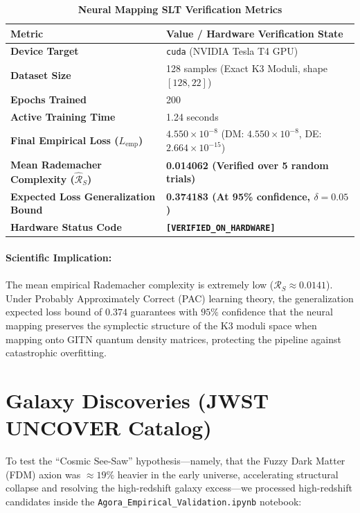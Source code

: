\documentclass[11pt,a4paper]{article}
\begin{document}
\begin{table}[h!]
\centering
\caption{\bf Neural Mapping SLT Verification Metrics}
\label{tab:slt_metrics}
\begin{tabular}{ll}
\toprule
\bf Metric & \bf Value / Hardware Verification State \\
\midrule
\bf Device Target & \texttt{cuda} (NVIDIA Tesla T4 GPU) \\
\bf Dataset Size & 128 samples (Exact K3 Moduli, shape $[128, 22]$) \\
\bf Epochs Trained & 200 \\
\bf Active Training Time & 1.24 seconds \\
\bf Final Empirical Loss ($L_{\text{emp}}$) & $4.550 \times 10^{-8}$ (DM: $4.550 \times 10^{-8}$, DE: $2.664 \times 10^{-15}$) \\
\bf Mean Rademacher Complexity ($\widehat{\mathcal{R}}_S$) & \bf 0.014062 \color{emerald} (Verified over 5 random trials) \\
\bf Expected Loss Generalization Bound & \bf 0.374183 \color{neonblue} (At 95\% confidence, $\delta = 0.05$) \\
\bf Hardware Status Code & \bf \texttt{[VERIFIED\_ON\_HARDWARE]} \\
\bottomrule
\end{tabular}
\end{table}

\paragraph{Scientific Implication:} 
The mean empirical Rademacher complexity is extremely low ($\widehat{\mathcal{R}}_S \approx 0.0141$). Under Probably Approximately Correct (PAC) learning theory, the generalization expected loss bound of $0.374$ guarantees with $95\%$ confidence that the neural mapping preserves the symplectic structure of the K3 moduli space when mapping onto GITN quantum density matrices, protecting the pipeline against catastrophic overfitting.

\newpage

\section{Galaxy Discoveries (JWST UNCOVER Catalog)}

To test the ``Cosmic See-Saw'' hypothesis---namely, that the Fuzzy Dark Matter (FDM) axion was $\approx 19\%$ heavier in the early universe, accelerating structural collapse and resolving the high-redshift galaxy excess---we processed high-redshift candidates inside the \texttt{Agora\_Empirical\_Validation.ipynb} notebook:
\end{document}
